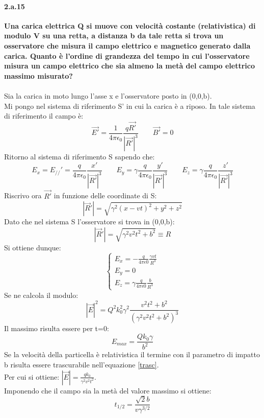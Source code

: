 \documentclass[twoside]{article}
\newcommand {\paral} {\mathrel{/\!/}}
\begin{document}
\paragraph{2.a.15}\textbf{Una carica elettrica Q si muove con velocità costante (relativistica) di modulo V su una retta, a distanza b da tale retta si trova un osservatore che misura il campo elettrico e magnetico generato dalla carica. Quanto è l'ordine di grandezza del tempo in cui l'osservatore misura un campo elettrico che sia almeno la metà del campo elettrico massimo misurato?}\\
\\
Sia la carica in moto lungo l'asse x e l'osservatore posto in (0,0,b).\\
Mi pongo nel sistema di riferimento S' in cui la carica è a riposo. In tale sistema di riferimento il campo è:
\begin{equation}
    \vec{E'}=\frac{1}{4\pi\epsilon_0}\frac{q\vec{R'}}{|\vec{R'}|^3} \qquad \vec{B'}=0
\end{equation}
Ritorno al sistema di riferimento S sapendo che:
\begin{equation}
    E_x=E_{\paral}'=\frac{q}{4\pi\epsilon_0}\frac{x'}{|\vec{R'}|^3} \qquad E_y= \gamma\frac{q}{4\pi\epsilon_0}\frac{y'}{|\vec{R'}|^3} \qquad E_z= \gamma\frac{q}{4\pi\epsilon_0}\frac{z'}{|\vec{R'}|^3}
\end{equation}
Riscrivo ora $\vec{R'}$ in funzione delle coordinate di S:
\begin{equation}
    |\vec{R}'|=\sqrt{\gamma^2(x-vt)^2+y^2+z^2}
\end{equation}
Dato che nel sistema S l'osservatore si trova in (0,0,b):
\begin{equation}
    |\vec{R}'|=\sqrt{\gamma^2v^2t^2+b^2}\equiv R
\end{equation}
Si ottiene dunque:
\begin{equation}
\begin{cases}
    E_x=-\frac{q}{4\pi\epsilon 0}\frac{\gamma vt}{R^3} \\ E_y=0 \\ E_z= \gamma\frac{q}{4\pi\epsilon 0}\frac{b}{R^3}
\end{cases}
\end{equation}
Se ne calcola il modulo:
\begin{equation}\label{trasc}
    |\vec{E}|^2=Q^2k_0^2\gamma^2\frac{v^2t^2+b^2}{(\gamma^2v^2t^2+b^2)^3}
\end{equation}
Il massimo risulta essere per t=0:
\begin{equation}
    E_{max}=\frac{Qk_0\gamma}{b^2}
\end{equation}
Se la velocità della particella è relativistica il termine con il parametro di impatto b risulta essere trascurabile nell'equazione \ref{trasc}.\\
Per cui si ottiene: $|\vec{E}|=\frac{qk_0}{\gamma^2v^2t^2}$.\\
Imponendo che il campo sia la metà del valore massimo si ottiene:
\begin{equation}\label{koko}
    t_{1/2}=\frac{\sqrt{2}b}{v\gamma^{3/2}}
\end{equation}
\end{document}
